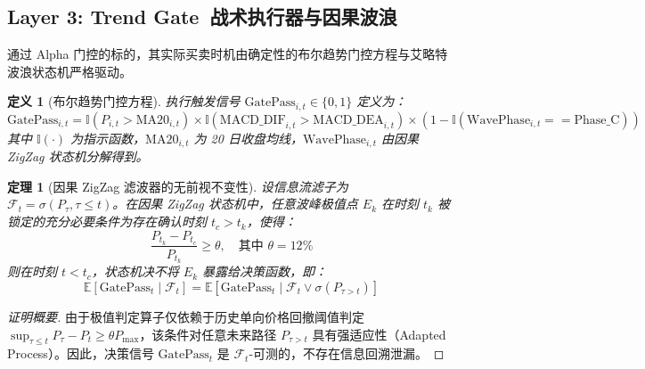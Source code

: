 \documentclass[11pt,a4paper]{article}
\newtheorem{theorem}{定理}
\newtheorem{definition}{定义}
\begin{document}
\subsection{Layer 3: Trend Gate\texttrademark\ 战术执行器与因果波浪}

通过 Alpha 门控的标的，其实际买卖时机由确定性的布尔趋势门控方程与艾略特波浪状态机严格驱动。

\begin{definition}[布尔趋势门控方程]
执行触发信号 $\text{GatePass}_{i,t} \in \{0, 1\}$ 定义为：
\begin{equation}
\text{GatePass}_{i,t} = \mathbb{I}(P_{i,t} > \text{MA20}_{i,t}) \times \mathbb{I}(\text{MACD\_DIF}_{i,t} > \text{MACD\_DEA}_{i,t}) \times (1 - \mathbb{I}(\text{WavePhase}_{i,t} == \text{Phase\_C}))
\end{equation}
其中 $\mathbb{I}(\cdot)$ 为指示函数，$\text{MA20}_{i,t}$ 为 20 日收盘均线，$\text{WavePhase}_{i,t}$ 由因果 ZigZag 状态机分解得到。
\end{definition}

\begin{theorem}[因果 ZigZag 滤波器的无前视不变性]
设信息流滤子为 $\mathcal{F}_t = \sigma(P_\tau, \tau \le t)$。在因果 ZigZag 状态机中，任意波峰极值点 $E_k$ 在时刻 $t_k$ 被锁定的充分必要条件为存在确认时刻 $t_c > t_k$，使得：
\begin{equation}
\frac{P_{t_k} - P_{t_c}}{P_{t_k}} \ge \theta, \quad \text{其中 } \theta = 12\%
\end{equation}
则在时刻 $t < t_c$，状态机决不将 $E_k$ 暴露给决策函数，即：
\begin{equation}
\mathbb{E}[\text{GatePass}_t \mid \mathcal{F}_t] = \mathbb{E}[\text{GatePass}_t \mid \mathcal{F}_t \vee \sigma(P_{\tau > t})]
\end{equation}
\end{theorem}
\begin{proof}[证明概要]
由于极值判定算子仅依赖于历史单向价格回撤阈值判定 $\sup_{\tau \le t} P_\tau - P_t \ge \theta P_{\text{max}}$，该条件对任意未来路径 $P_{\tau > t}$ 具有强适应性（Adapted Process）。因此，决策信号 $\text{GatePass}_t$ 是 $\mathcal{F}_t$-可测的，不存在信息回溯泄漏。
\end{proof}
\end{document}
